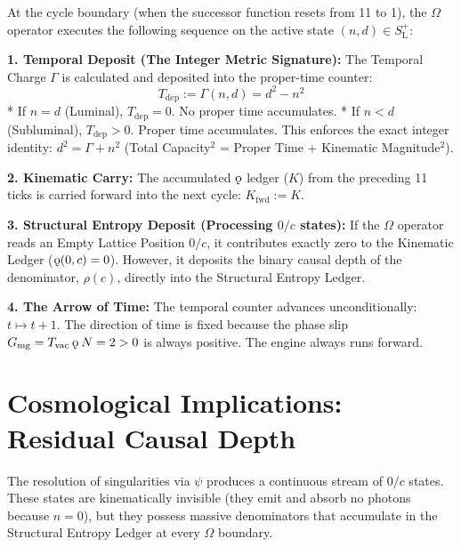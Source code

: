 \documentclass[11pt, letterpaper]{article}
\newcommand{\SLpos}{S_{\mathrm{L}}^{+}}
\newcommand{\koppa}{\mathbin{\text{\rm\k{o}}}}
\newcommand{\Tvac}{T_{\mathrm{vac}}}
\newcommand{\Gmg}{G_{\mathrm{mg}}}
\newcommand{\psiop}{\psi}
\newcommand{\rank}{\rho}
\newcommand{\Tcharge}{\Gamma}
\begin{document}
\begin{definition}\label{def:omega}
\begin{rsbox}
At the cycle boundary (when the successor function resets from 11 to 1), the $\Omega$ operator executes the following sequence on the active state $(n,d) \in \SLpos$:

\textbf{1. Temporal Deposit (The Integer Metric Signature):}
The Temporal Charge $\Tcharge$ is calculated and deposited into the proper-time counter:
\[ T_{\mathrm{dep}} := \Tcharge(n,d) = d^2 - n^2 \]
*   If $n=d$ (Luminal), $T_{\mathrm{dep}} = 0$. No proper time accumulates.
*   If $n<d$ (Subluminal), $T_{\mathrm{dep}} > 0$. Proper time accumulates.
This enforces the exact integer identity: $d^2 = \Tcharge + n^2$ (Total Capacity$^2$ = Proper Time + Kinematic Magnitude$^2$).

\textbf{2. Kinematic Carry:}
The accumulated $\koppa$ ledger ($K$) from the preceding 11 ticks is carried forward into the next cycle: $K_{\mathrm{fwd}} := K$.

\textbf{3. Structural Entropy Deposit (Processing $0/c$ states):}
If the $\Omega$ operator reads an Empty Lattice Position $0/c$, it contributes exactly zero to the Kinematic Ledger ($\koppa(0, c) = 0$). However, it deposits the binary causal depth of the denominator, $\rank(c)$, directly into the Structural Entropy Ledger.

\textbf{4. The Arrow of Time:}
The temporal counter advances unconditionally: $t \mapsto t + 1$.
The direction of time is fixed because the phase slip $\Gmg = \Tvac \koppa N = 2 > 0$ is always positive. The engine always runs forward.
\end{rsbox}
\end{definition}

\section{Cosmological Implications: Residual Causal Depth}

The resolution of singularities via $\psiop$ produces a continuous stream of $0/c$ states. These states are kinematically invisible (they emit and absorb no photons because $n=0$), but they possess massive denominators that accumulate in the Structural Entropy Ledger at every $\Omega$ boundary.
\end{document}

